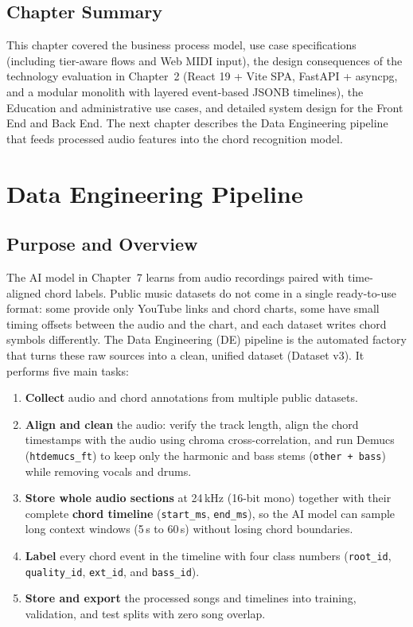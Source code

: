 \documentclass[a4paper]{article}
\begin{document}
\subsection{Chapter Summary}

This chapter covered the business process model, use case specifications (including tier-aware flows and Web MIDI input), the design consequences of the technology evaluation in Chapter~2 (React 19 + Vite SPA, FastAPI + asyncpg, and a modular monolith with layered event-based JSONB timelines), the Education and administrative use cases, and detailed system design for the Front End and Back End. The next chapter describes the Data Engineering pipeline that feeds processed audio features into the chord recognition model.

\newpage
\section{Data Engineering Pipeline}

\subsection{Purpose and Overview}

The AI model in Chapter~7 learns from audio recordings paired with time-aligned chord labels. Public music datasets do not come in a single ready-to-use format: some provide only YouTube links and chord charts, some have small timing offsets between the audio and the chart, and each dataset writes chord symbols differently. The Data Engineering (DE) pipeline is the automated factory that turns these raw sources into a clean, unified dataset (Dataset v3). It performs five main tasks:

\begin{enumerate}
    \item \textbf{Collect} audio and chord annotations from multiple public datasets.
    \item \textbf{Align and clean} the audio: verify the track length, align the chord timestamps with the audio using chroma cross-correlation, and run Demucs (\texttt{htdemucs\_ft}) to keep only the harmonic and bass stems (\texttt{other + bass}) while removing vocals and drums.
    \item \textbf{Store whole audio sections} at 24\,kHz (16-bit mono) together with their complete \textbf{chord timeline} (\texttt{start\_ms}, \texttt{end\_ms}), so the AI model can sample long context windows (5\,s to 60\,s) without losing chord boundaries.
    \item \textbf{Label} every chord event in the timeline with four class numbers (\texttt{root\_id}, \texttt{quality\_id}, \texttt{ext\_id}, and \texttt{bass\_id}).
    \item \textbf{Store and export} the processed songs and timelines into training, validation, and test splits with zero song overlap.
\end{enumerate}
\end{document}
